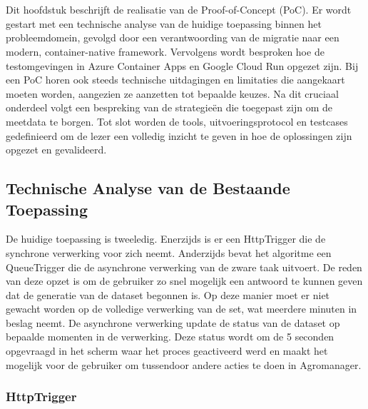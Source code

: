 \chapter{}%
\label{ch:proof-of-concept}

Dit hoofdstuk beschrijft de realisatie van de Proof-of-Concept (PoC). Er wordt gestart met een technische analyse van de huidige toepassing binnen het probleemdomein, gevolgd door een verantwoording van de migratie naar een modern, container-native framework. Vervolgens wordt besproken hoe de testomgevingen in Azure Container Apps en Google Cloud Run opgezet zijn. Bij een PoC horen ook steeds technische uitdagingen en limitaties die aangekaart moeten worden, aangezien ze aanzetten tot bepaalde keuzes. Na dit cruciaal onderdeel volgt een bespreking van de strategieën die toegepast zijn om de meetdata te borgen. Tot slot worden de tools, uitvoeringsprotocol en testcases gedefinieerd om de lezer een volledig inzicht te geven in hoe de oplossingen zijn opgezet en gevalideerd.

\section{Technische Analyse van de Bestaande Toepassing}

De huidige toepassing is tweeledig. Enerzijds is er een HttpTrigger die de synchrone verwerking voor zich neemt. Anderzijds bevat het algoritme een QueueTrigger die de asynchrone verwerking van de zware taak uitvoert. De reden van deze opzet is om de gebruiker zo snel mogelijk een antwoord te kunnen geven dat de generatie van de dataset begonnen is. Op deze manier moet er niet gewacht worden op de volledige verwerking van de set, wat meerdere minuten in beslag neemt. De asynchrone verwerking update de status van de dataset op bepaalde momenten in de verwerking. Deze status wordt om de 5 seconden opgevraagd in het scherm waar het proces geactiveerd werd en maakt het mogelijk voor de gebruiker om tussendoor andere acties te doen in Agromanager. 

\subsection{HttpTrigger} 

